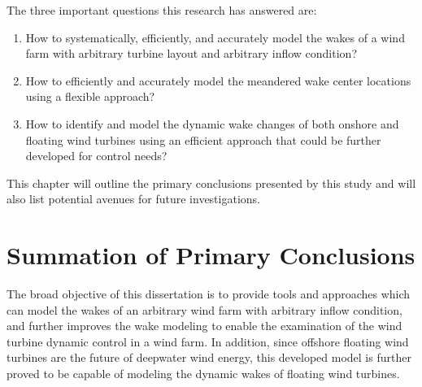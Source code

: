 \documentclass{umthesis}
\begin{document}
The three important questions this research has answered are:
\begin{enumerate}
  \item How to systematically, efficiently, and accurately model the wakes of a wind farm with arbitrary turbine layout and arbitrary inflow condition?
  \item How to efficiently and accurately model the meandered wake center locations using a flexible approach?
  \item How to identify and model the dynamic wake changes of both onshore and floating wind turbines using an efficient approach that could be further developed for control needs?  
\end{enumerate}

This chapter will outline the primary conclusions presented by this study and will also list potential avenues for future investigations.

\section{Summation of Primary Conclusions}  
The broad objective of this dissertation is to provide tools and approaches which can model the wakes of an arbitrary wind farm with arbitrary inflow condition, and further improves the wake modeling to enable the examination of the wind turbine dynamic control in a wind farm. In addition, since offshore floating wind turbines are the future of deepwater wind energy, this developed model is further proved to be capable of modeling the dynamic wakes of floating wind turbines. 
\end{document}

